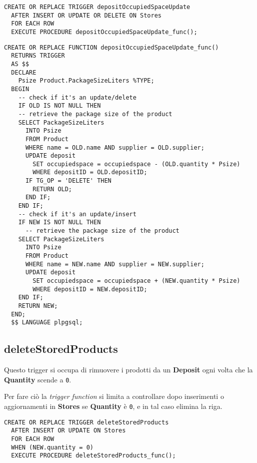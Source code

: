 \begin{lstlisting}[caption={Trigger per implementare \textbf{depositOccupiedSpaceUpdate}}]
  CREATE OR REPLACE TRIGGER depositOccupiedSpaceUpdate
  AFTER INSERT OR UPDATE OR DELETE ON Stores
  FOR EACH ROW
  EXECUTE PROCEDURE depositOccupiedSpaceUpdate_func();
\end{lstlisting}

\begin{lstlisting}[caption={Funzione \textbf{depositOccupiedSpaceUpdate}}]
  CREATE OR REPLACE FUNCTION depositOccupiedSpaceUpdate_func()
  RETURNS TRIGGER
  AS $$
  DECLARE
    Psize Product.PackageSizeLiters %TYPE;
  BEGIN
    -- check if it's an update/delete 
    IF OLD IS NOT NULL THEN
    -- retrieve the package size of the product
    SELECT PackageSizeLiters
      INTO Psize
      FROM Product
      WHERE name = OLD.name AND supplier = OLD.supplier;
      UPDATE deposit
        SET occupiedspace = occupiedspace - (OLD.quantity * Psize)
        WHERE depositID = OLD.depositID;
      IF TG_OP = 'DELETE' THEN
        RETURN OLD;
      END IF;
    END IF;
    -- check if it's an update/insert
    IF NEW IS NOT NULL THEN
      -- retrieve the package size of the product
    SELECT PackageSizeLiters
      INTO Psize
      FROM Product
      WHERE name = NEW.name AND supplier = NEW.supplier;
      UPDATE deposit
        SET occupiedspace = occupiedspace + (NEW.quantity * Psize)
        WHERE depositID = NEW.depositID;
    END IF;
    RETURN NEW;
  END;
  $$ LANGUAGE plpgsql;
\end{lstlisting}

\subsection{\textbf{deleteStoredProducts}}

Questo trigger si occupa di rimuovere i prodotti da un \textbf{Deposit} ogni volta che la \textbf{Quantity} scende a \lstinline{0}.

Per fare ciò la \textit{trigger function} si limita a controllare dopo inserimenti o aggiornamenti in \textbf{Stores} se \textbf{Quantity} è \lstinline{0}, e in tal caso elimina la riga.

\begin{lstlisting}[caption={Trigger per implementare \textbf{deleteStoredProducts}}]
  CREATE OR REPLACE TRIGGER deleteStoredProducts
  AFTER INSERT OR UPDATE ON Stores
  FOR EACH ROW
  WHEN (NEW.quantity = 0)
  EXECUTE PROCEDURE deleteStoredProducts_func();
\end{lstlisting}

